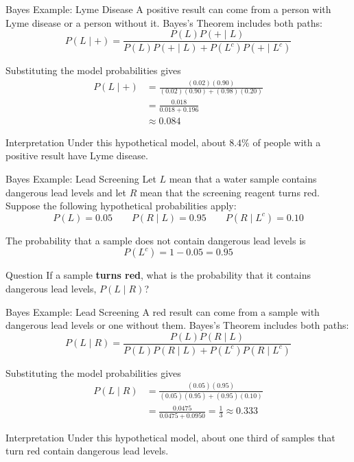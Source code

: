 \documentclass[aspectratio=169]{beamer}
\begin{document}
\begin{frame}{Bayes Example: Lyme Disease}
A positive result can come from a person with Lyme disease or a person without it. Bayes's Theorem includes both paths:
$$P(L\mid +)=\frac{P(L)P(+\mid L)}{P(L)P(+\mid L)+P(L^c)P(+\mid L^c)}$$

Substituting the model probabilities gives
$$
\begin{aligned}
P(L\mid +)
&=\frac{(0.02)(0.90)}{(0.02)(0.90)+(0.98)(0.20)}\\
&=\frac{0.018}{0.018+0.196}\\
&\approx\boxed{0.084}
\end{aligned}
$$

\begin{block}{Interpretation}
Under this hypothetical model, about $8.4\%$ of people with a positive result have Lyme disease.
\end{block}
\end{frame}

\begin{frame}{Bayes Example: Lead Screening}
Let $L$ mean that a water sample contains dangerous lead levels and let $R$ mean that the screening reagent turns red. Suppose the following hypothetical probabilities apply:
$$P(L)=0.05 \qquad P(R\mid L)=0.95 \qquad P(R\mid L^c)=0.10$$

The probability that a sample does not contain dangerous lead levels is
$$P(L^c)=1-0.05=0.95$$

\begin{block}{Question}
If a sample \textbf{turns red}, what is the probability that it contains dangerous lead levels, $P(L\mid R)$?
\end{block}
\end{frame}

\begin{frame}{Bayes Example: Lead Screening}
A red result can come from a sample with dangerous lead levels or one without them. Bayes's Theorem includes both paths:
$$P(L\mid R)=\frac{P(L)P(R\mid L)}{P(L)P(R\mid L)+P(L^c)P(R\mid L^c)}$$

Substituting the model probabilities gives
$$
\begin{aligned}
P(L\mid R)
&=\frac{(0.05)(0.95)}{(0.05)(0.95)+(0.95)(0.10)}\\
&=\frac{0.0475}{0.0475+0.0950}=\boxed{\frac{1}{3}\approx 0.333}
\end{aligned}
$$

\begin{block}{Interpretation}
Under this hypothetical model, about one third of samples that turn red contain dangerous lead levels.
\end{block}
\end{frame}
\end{document}
